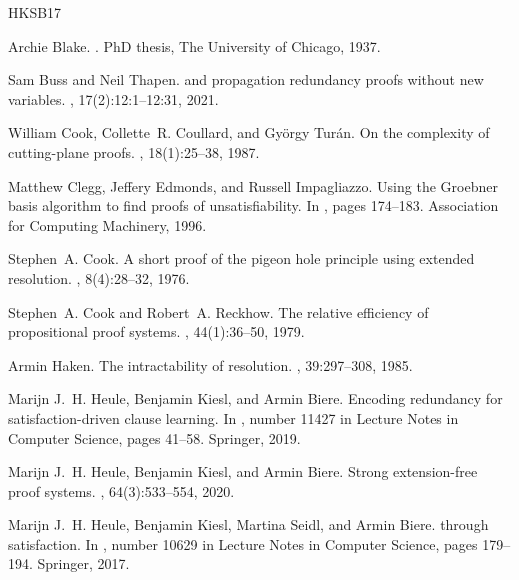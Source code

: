 \documentclass[12pt]{article}
\begin{document}
\begin{thebibliography}{HKSB17}

  Archie Blake.
  .
  \newblock PhD thesis, The University of Chicago, 1937.

  Sam Buss and Neil Thapen.
   and propagation redundancy proofs without new variables.
  , 17(2):12:1--12:31, 2021.

  William Cook, Collette~R. Coullard, and Gy{\"o}rgy Tur{\'a}n.
  \newblock On the complexity of cutting-plane proofs.
  , 18(1):25--38, 1987.

  Matthew Clegg, Jeffery Edmonds, and Russell Impagliazzo.
  \newblock Using the {Groebner} basis algorithm to find proofs of
  unsatisfiability.
  \newblock In {\em {}}, pages 174--183. Association for Computing
  Machinery, 1996.

  Stephen~A. Cook.
  \newblock A short proof of the pigeon hole principle using extended resolution.
  , 8(4):28--32, 1976.

  Stephen~A. Cook and Robert~A. Reckhow.
  \newblock The relative efficiency of propositional proof systems.
  , 44(1):36--50, 1979.

  Armin Haken.
  \newblock The intractability of resolution.
  , 39:297--308, 1985.

  Marijn J.~H. Heule, Benjamin Kiesl, and Armin Biere.
  \newblock Encoding redundancy for satisfaction-driven clause learning.
  \newblock In {\em {}}, number 11427 in Lecture Notes in Computer
  Science, pages 41--58. Springer, 2019.

  Marijn J.~H. Heule, Benjamin Kiesl, and Armin Biere.
  \newblock Strong extension-free proof systems.
  , 64(3):533--554, 2020.

  Marijn J.~H. Heule, Benjamin Kiesl, Martina Seidl, and Armin Biere.
   through satisfaction.
  \newblock In {\em {}}, number 10629 in Lecture Notes in Computer Science,
  pages 179--194. Springer, 2017.


\end{thebibliography}
\end{document}
